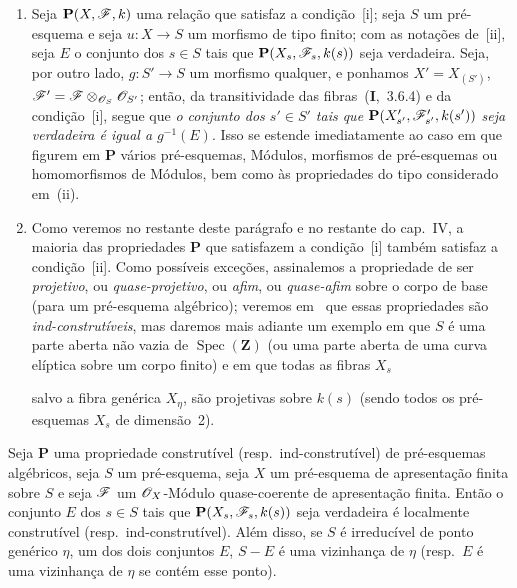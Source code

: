 \begin{remarks}[9.2.2]
\begin{enumerate}[label=(\roman*)]
  \item Seja $\mathbf{P}(X,\mathscr{F},k)$ uma relação que satisfaz a condição~[i]; seja $S$ um pré-esquema e seja $u:X\to S$ um morfismo de tipo finito; com as notações de~[ii], seja $E$ o conjunto dos $s\in S$ tais que $\mathbf{P}(X_s,\mathscr{F}_s,k(s))$ seja verdadeira.
Seja, por outro lado, $g:S'\to S$ um morfismo qualquer, e ponhamos $X'=X_{(S')}$, $\mathscr{F}'=\mathscr{F}\otimes_{\mathscr{O}_S}\mathscr{O}_{S'}$; então, da transitividade das fibras~(\textbf{I},~3.6.4) e da condição~[i], segue que \emph{o conjunto dos $s'\in S'$ tais que $\mathbf{P}(X'_{s'},\mathscr{F}'_{s'},k(s'))$ seja verdadeira é igual a $g^{-1}(E)$}.
Isso se estende imediatamente ao caso em que figurem em $\mathbf{P}$ vários pré-esquemas, Módulos, morfismos de pré-esquemas ou homomorfismos de Módulos, bem como às propriedades do tipo considerado em~(ii).

  \item Como veremos no restante deste parágrafo e no restante do cap.~IV, a maioria das propriedades $\mathbf{P}$ que satisfazem a condição~[i] também satisfaz a condição~[ii].
Como possíveis exceções, assinalemos a propriedade de ser \emph{projetivo}, ou \emph{quase-projetivo}, ou \emph{afim}, ou \emph{quase-afim} sobre o corpo de base (para um pré-esquema algébrico); veremos em~ que essas propriedades são \emph{ind-construtíveis}, mas daremos mais adiante um exemplo em que $S$ é uma parte aberta não vazia de $\operatorname{Spec}(\mathbf{Z})$ (ou uma parte aberta de uma curva elíptica sobre um corpo finito) e em que todas as fibras $X_s$

salvo a fibra genérica $X_\eta$, são projetivas sobre $k(s)$ (sendo todos os pré-esquemas $X_s$ de dimensão~2).
\end{enumerate}
\end{remarks}

\begin{proposition}[9.2.3]
\label{IV.9.2.3}
Seja $\mathbf{P}$ uma propriedade construtível \textnormal{(}resp.\ ind-construtível\textnormal{)} de pré-esquemas algébricos, seja $S$ um pré-esquema, seja $X$ um pré-esquema de apresentação finita sobre $S$ e seja $\mathscr{F}$ um $\mathscr{O}_X$-Módulo quase-coerente de apresentação finita.
Então o conjunto $E$ dos $s\in S$ tais que $\mathbf{P}(X_s,\mathscr{F}_s,k(s))$ seja verdadeira é localmente construtível \textnormal{(}resp.\ ind-construtível\textnormal{)}.
Além disso, se $S$ é irreducível de ponto genérico $\eta$, um dos dois conjuntos $E$, $S-E$ é uma vizinhança de $\eta$ \textnormal{(}resp.\ $E$ é uma vizinhança de $\eta$ se contém esse ponto\textnormal{)}.
\end{proposition}

